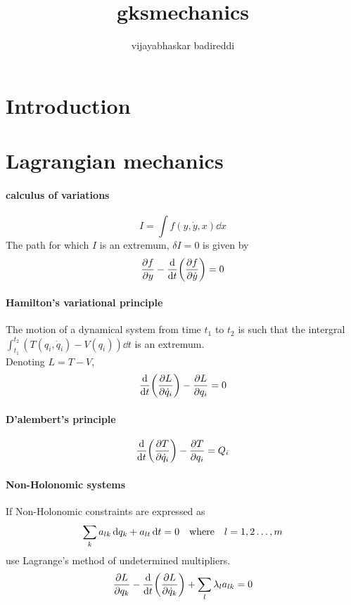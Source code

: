 \documentclass[12pt]{article}
\title{gksmechanics}
\author{vijayabhaskar badireddi}
\begin{document}

\section*{Introduction}

\section*{Lagrangian mechanics}
\paragraph{calculus of variations}
\[I=\int f(y,\dot{y},x)\dd{x}\]
The path for which $I$ is an extremum, $\delta{I}=0$ is given by \[\pdv{f}{y}-\dv{t}\qty(\pdv{f}{\dot{y}})=0\]
\paragraph{Hamilton's variational principle}
The motion of a dynamical system from time $t_1$ to $t_2$ is such that the intergral $\int_{t_1}^{t_2}(T(q_i,\dot{q}_i)-V(q_i))\dd{t}$ is an extremum.\\
Denoting $L=T-V$, \[\dv{t}\qty(\pdv{L}{\dot{q}_i})-\pdv{L}{q_i}=0\]
\paragraph{D'alembert's principle}
\[\dv{t}\qty(\pdv{T}{\dot{q}_i})-\pdv{T}{q_i}=Q_i\]
\paragraph{Non-Holonomic systems}
If Non-Holonomic constraints are expressed as
\[ \sum_ka_{lk}\dd{q_k}+a_{lt}\dd{t}=0 \qq{where}l=1,2\ldots,m\] use Lagrange's method of undetermined multipliers.
\[\pdv{L}{q_k}-\dv{t}\qty(\pdv{L}{\dot{q}_k})+\sum_l\lambda_la_{lk}=0\]
\end{document}
